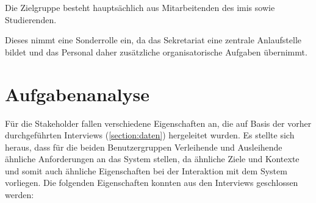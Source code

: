 Die Zielgruppe besteht hauptsächlich aus Mitarbeitenden des \ac{imis} sowie
Studierenden.


Dieses nimmt eine Sonderrolle ein, da das Sekretariat eine zentrale Anlaufstelle
bildet und das Personal daher zusätzliche organisatorische Aufgaben übernimmt.



\section{Aufgabenanalyse}
\label{section:aufgaben}

Für die Stakeholder fallen verschiedene Eigenschaften an, die auf Basis der
vorher durchgeführten Interviews (\ref{section:daten}) hergeleitet wurden. Es
stellte sich heraus, dass für die beiden Benutzergruppen \glqq
Verleihende\grqq{} und \glqq Ausleihende\grqq{} ähnliche Anforderungen an das
System stellen, da ähnliche Ziele und Kontexte und somit auch ähnliche
Eigenschaften bei der Interaktion mit dem System vorliegen. Die folgenden
Eigenschaften konnten aus den Interviews geschlossen werden:

